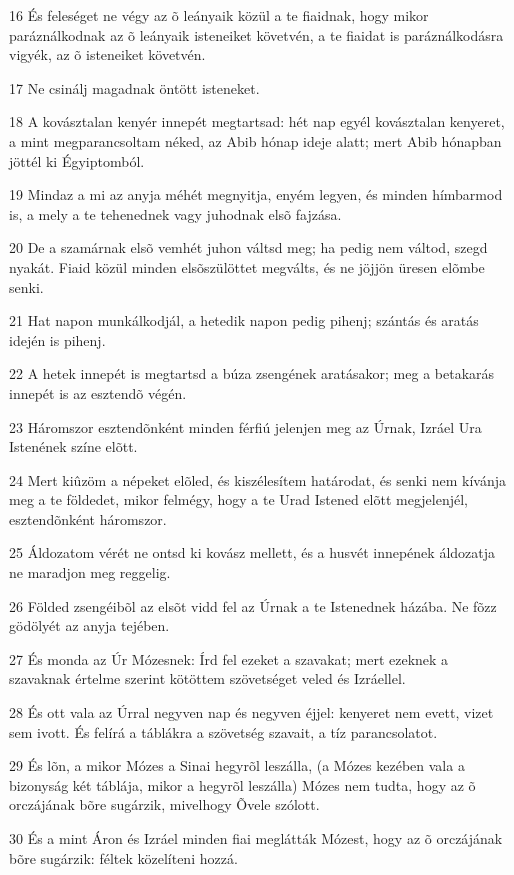 \par 16 És feleséget ne végy az õ leányaik közül a te fiaidnak, hogy mikor paráználkodnak az õ leányaik isteneiket követvén, a te fiaidat is paráználkodásra vigyék, az õ isteneiket követvén.
\par 17 Ne csinálj magadnak öntött isteneket.
\par 18 A kovásztalan kenyér innepét megtartsad: hét nap egyél kovásztalan kenyeret, a mint megparancsoltam néked, az Abib hónap ideje alatt; mert Abib hónapban jöttél ki Égyiptomból.
\par 19 Mindaz a mi az anyja méhét megnyitja, enyém legyen, és minden hímbarmod is, a mely a te tehenednek vagy juhodnak elsõ fajzása.
\par 20 De a szamárnak elsõ vemhét juhon váltsd meg; ha pedig nem váltod, szegd nyakát. Fiaid közül minden elsõszülöttet megválts, és ne jöjjön üresen  elõmbe senki.
\par 21 Hat napon munkálkodjál, a hetedik napon pedig pihenj; szántás és aratás idején is pihenj.
\par 22 A hetek innepét is megtartsd a búza zsengének aratásakor; meg a betakarás innepét is az esztendõ végén.
\par 23 Háromszor esztendõnként minden férfiú jelenjen meg az Úrnak, Izráel Ura Istenének színe elõtt.
\par 24 Mert kiûzöm a népeket elõled, és kiszélesítem határodat, és senki nem kívánja meg a te földedet, mikor felmégy, hogy a te Urad Istened elõtt megjelenjél, esztendõnként háromszor.
\par 25 Áldozatom vérét ne ontsd ki kovász mellett, és a husvét innepének áldozatja ne maradjon meg reggelig.
\par 26 Földed zsengéibõl az elsõt vidd fel az Úrnak a te Istenednek házába. Ne  fõzz gödölyét az anyja tejében.
\par 27 És monda az Úr Mózesnek: Írd fel ezeket a szavakat; mert ezeknek a szavaknak értelme szerint kötöttem szövetséget veled és Izráellel.
\par 28 És ott vala az Úrral negyven nap és negyven éjjel: kenyeret nem evett, vizet sem ivott. És felírá a  táblákra a szövetség szavait, a tíz parancsolatot.
\par 29 És lõn, a mikor Mózes a Sinai hegyrõl leszálla, (a Mózes kezében vala a bizonyság két táblája, mikor a hegyrõl leszálla) Mózes nem tudta, hogy az õ orczájának bõre sugárzik, mivelhogy Õvele szólott.
\par 30 És a mint Áron és Izráel minden fiai meglátták Mózest, hogy az õ orczájának bõre sugárzik: féltek közelíteni hozzá.
